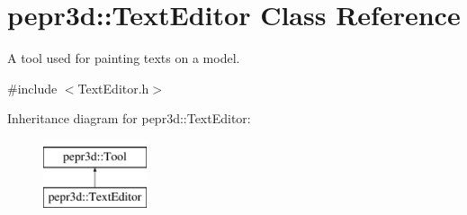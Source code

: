 \hypertarget{classpepr3d_1_1_text_editor}{}\section{pepr3d\+::Text\+Editor Class Reference}
\label{classpepr3d_1_1_text_editor}


A tool used for painting texts on a model.  




{\ttfamily \#include $<$Text\+Editor.\+h$>$}

Inheritance diagram for pepr3d\+::Text\+Editor\+:\begin{figure}[H]
\begin{center}
\leavevmode
\includegraphics[height=2.000000cm]{classpepr3d_1_1_text_editor}
\end{center}
\end{figure}
